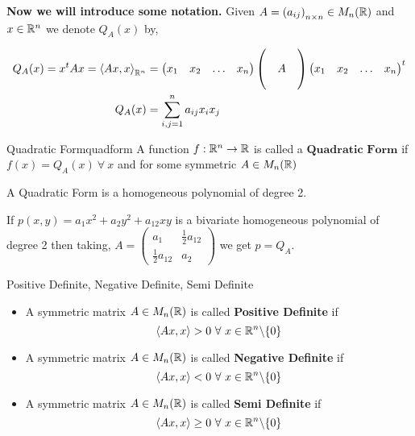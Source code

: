 \documentclass[../Analysis-3.tex]{subfiles}
\begin{document}
\textbf{Now we will introduce some notation.} Given $A = \left( a_{ij} \right)_{n\times n} \in M_n(\mathbb{R})$ and $ x \in \mathbb{R}^n $ we denote $ Q_A(x) $  by,

\begin{align*}
  Q_A(x) = x^tAx = {\left\langle Ax,x \right\rangle}_{\mathbb{R}^n}
         & = \begin{pmatrix}
               x_1 & x_2 & \ldots & x_n
             \end{pmatrix} \begin{pmatrix}
                              &   & \\
                              & A & \\
                              &   &
                           \end{pmatrix} \begin{pmatrix}
                                           x_1 & x_2 & \ldots & x_n
                                         \end{pmatrix} ^t \\
  Q_A(x) & = \sum_{i,j = 1}^{n} a_{ij} x_i x_j
\end{align*}



\begin{Def}{Quadratic Form}{quadform}
  A function $f : \mathbb{R}^n \to \mathbb{R}$ is called a $\textbf{Quadratic Form}$ if $f(x) = Q_A(x) \ \forall\ x $ and for some symmetric $A \in M_n(\mathbb{R})$
\end{Def}

A Quadratic Form is a homogeneous polynomial of degree 2.

If $p(x,y) = a_1 x^2 + a_2 y^2 + a_{12} xy$
is a bivariate homogeneous polynomial of degree 2 then taking, $A = \begin{pmatrix}
    a_1                & \frac{1}{2} a_{12} \\
    \frac{1}{2} a_{12} & a_2
  \end{pmatrix}$ we get $p = Q_A$.

\begin{Def}{Positive Definite, Negative Definite, Semi Definite}{}
  \begin{itemize}
    \item A symmetric matrix $A \in M_n(\mathbb{R})$ is called \textbf{Positive Definite} if \[ \left\langle Ax, x \right\rangle > 0 \ \forall\ x \in \R^n \backslash \{0\} \]
    \item A symmetric matrix $A \in M_n(\mathbb{R})$ is called \textbf{Negative Definite} if \[ \left\langle Ax, x \right\rangle < 0 \ \forall\ x \in \R^n \backslash \{0\} \]
    \item A symmetric matrix $A \in M_n(\mathbb{R})$ is called \textbf{Semi Definite} if \[ \left\langle Ax, x \right\rangle \geq 0 \ \forall\ x \in \R^n \backslash \{0\} \]
  \end{itemize}
\end{Def}
\end{document}
